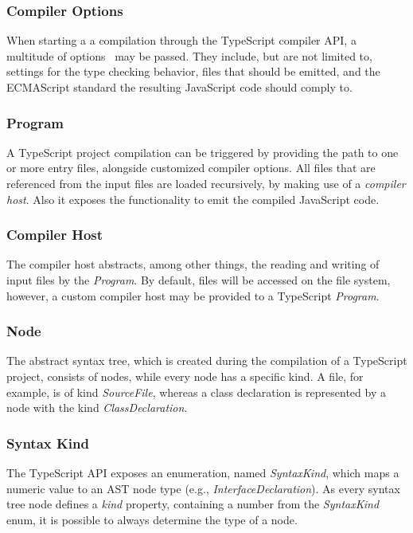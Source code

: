 \subsubsection{Compiler Options}

When starting a a compilation through the TypeScript compiler API, a multitude of options~\cite{TypeScriptHandbook:CompilerOptions} may be passed. They include, but are not limited to, settings for the type checking behavior, files that should be emitted, and the ECMAScript standard the resulting JavaScript code should comply to.

\subsubsection{Program}

A TypeScript project compilation can be triggered by providing the path to one or more entry files, alongside customized compiler options. All files that are referenced from the input files are loaded recursively, by making use of a \emph{compiler host}. Also it exposes the functionality to emit the compiled JavaScript code.

\subsubsection{Compiler Host}

The compiler host abstracts, among other things, the reading and writing of input files by the \emph{Program}. By default, files will be accessed on the file system, however, a custom compiler host may be provided to a TypeScript \emph{Program}.

\subsubsection{Node}

The abstract syntax tree, which is created during the compilation of a TypeScript project, consists of nodes, while every node has a specific kind. A file, for example, is of kind \emph{SourceFile}, whereas a class declaration is represented by a node with the kind \emph{ClassDeclaration}.

\subsubsection{Syntax Kind}

The TypeScript API exposes an enumeration, named \emph{SyntaxKind}, which maps a numeric value to an AST node type (e.g., \emph{InterfaceDeclaration}). As every syntax tree node defines a \emph{kind} property, containing a number from the \emph{SyntaxKind} enum, it is possible to always determine the type of a node.

